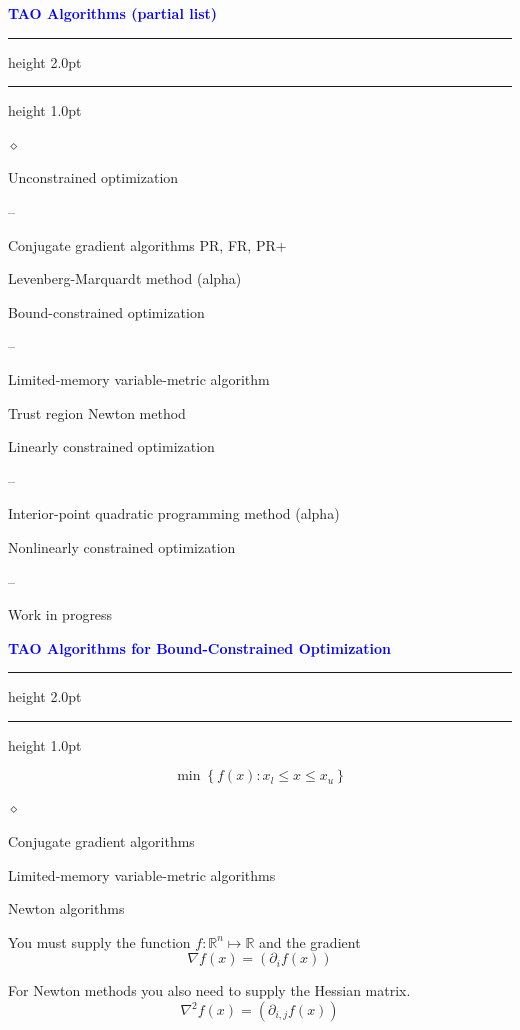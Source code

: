 \documentclass{seminar}
\newcommand{\R}{\mbox{${\mathbb R}$}}
\newcommand{\grad}{\nabla}
\newcommand{\reddiamond}{\textcolor{BrickRed}{$\diamond$}}
\newcommand{\reddash}{\textcolor{BrickRed}{--}}
\newcommand{\redstripe}{\textcolor{BrickRed}{\hrule height 2.0pt\hfil}
             \vspace{-1.8pt}
             \textcolor{BrickRed}{\hrule height 1.0pt\hfil}
}
\newcommand{\heading}[1]{%
   \vspace*{0.5pt}%
   \centerline{\textcolor{Blue}{\textbf{#1}}}%
   \redstripe
}
\begin{document}
\begin{slide}

\heading{TAO Algorithms (partial list)}

\begin{list}{\reddiamond}
{ \setlength{\itemsep}{0pt}}
\item
Unconstrained optimization 
\begin{list}{\reddash}{}
\item
Conjugate gradient algorithms PR, FR, PR+
\item
Levenberg-Marquardt method (alpha)
\end{list}
\item
Bound-constrained optimization
\begin{list}{\reddash}{}
\item
Limited-memory variable-metric algorithm
\item
Trust region Newton method
\end{list}
\item
Linearly constrained optimization
\begin{list}{\reddash}{}
\item
Interior-point quadratic programming  method (alpha)
\end{list}
\item
Nonlinearly constrained optimization
\begin{list}{\reddash}{}
\item
Work in progress
\end{list}
\end{list}

\end{slide}

\begin{slide}

\heading{TAO Algorithms for Bound-Constrained Optimization}

\[
\min \left \{  f(x) : x_l \le x \le x_u \right \}
\]

\medskip

\begin{list}{\reddiamond}{}
\item
Conjugate gradient algorithms
\item
Limited-memory variable-metric algorithms
\item
Newton algorithms
\end{list}

You must supply the function $ f : \R^n \mapsto \R $ and the
gradient 
\[
\grad f (x) = \left ( \partial _i f(x) \right )
\]

For Newton methods you also need to supply the Hessian matrix.
\[
\grad^2 f (x) = \left ( \partial_{i,j} f(x) \right )
\]

\vfill

\end{slide}
\end{document}
